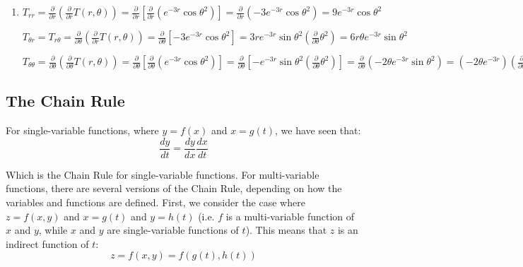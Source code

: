\begin{Answer}[ref = second]
\begin{enumerate}
\item $T_{rr} = \frac{\partial}{\partial r} \left( \frac{\partial}{\partial r} 
T(r, \theta) \right) = \frac{\partial}{\partial r} \left[ \frac{\partial}{
\partial r} \left( e^{-3r} \cos{\theta^2} \right) \right] = \frac{\partial}{
\partial r} \left( -3e^{-3r} \cos{ \theta ^2 } \right) = 9e^{-3r} \cos{ 
\theta^2 }$

$T_{\theta r} = T_{r \theta} = \frac{\partial}{\partial \theta} \left( \frac{
\partial}{\partial r} T(r, \theta) \right) = \frac{\partial}{\partial \theta} 
\left[ -3e^{-3r} \cos{ \theta^2} \right] = 3re^{-3r} \sin{ \theta^2} \left( 
\frac{\partial}{\partial \theta} \theta^2 \right) = 6r\theta e^{-3r} \sin{ 
\theta^2}$

$T_{\theta \theta} = \frac{\partial}{\partial \theta} \left( \frac{\partial}{
\partial \theta} T(r, \theta) \right) = \frac{\partial}{\partial \theta} \left[
\frac{\partial}{\partial \theta} \left( e^{-3r}\cos{ \theta^2} \right) \right] 
= \frac{\partial}{\partial \theta} \left[ -e^{-3r} \sin{ \theta^2} \left( 
\frac{\partial}{\partial \theta} \theta^2 \right) \right] = \frac{\partial}{
\partial \theta} \left( -2 \theta e^{-3r} \sin{ \theta^2} \right) = \left(-2
\theta e^{-3r} \right) \left( \frac{\partial}{\partial \theta} \sin{ \theta ^2}
\right) + \left(\sin{\theta^2} \right) \left[ \frac{\partial}{\partial \theta} 
\left( -2\theta e^{-3r} \right) \right] = \left( -2 \theta e^{-3r} \right) 
\left( \cos{ \theta^2} \right) \left( \frac{\partial}{\partial \theta} \theta^2
\right) + \left( \sin{ \theta^2 } \right) \left( -2e^{-3r} \right) = -4\theta^2
e^{-3r} \cos{\theta^2} - 2e^{-3r}\sin{\theta^2}$
\end{enumerate}
\end{Answer}

\subsection{The Chain Rule}
For single-variable functions, where $y = f(x)$ and $x = g(t)$, we have seen 
that:
$$\frac{dy}{dt} = \frac{dy}{dx} \frac{dx}{dt}$$

Which is the Chain Rule for single-variable functions. For multi-variable 
functions, there are several versions of the Chain Rule, depending on how the 
variables and functions are defined. First, we consider the case where $z = 
f(x, y)$ and $x = g(t)$ and $y = h(t)$ (i.e. $f$ is a multi-variable function 
of $x$ and $y$, while $x$ and $y$ are single-variable functions of $t$). This 
means that $z$ is an indirect function of $t$:
$$z = f(x, y) = f \left( g(t), h(t) \right)$$

